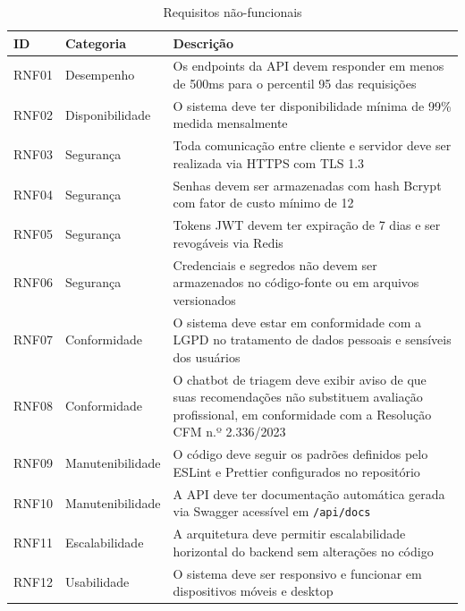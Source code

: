 \begin{table}[H]
  \centering
  \caption{Requisitos não-funcionais}
  \label{tab:non-functional-requirements}
  \begin{tabular}{p{1.2cm}p{3cm}p{7cm}}
    \toprule
    \textbf{ID} &
    \textbf{Categoria} &
    \textbf{Descrição} \\
    \midrule
    RNF01 & Desempenho
          & Os endpoints da API devem responder
            em menos de 500ms para o percentil
            95 das requisições \\
    RNF02 & Disponibilidade
          & O sistema deve ter disponibilidade
            mínima de 99\% medida mensalmente \\
    RNF03 & Segurança
          & Toda comunicação entre cliente e
            servidor deve ser realizada via
            HTTPS com TLS 1.3 \\
    RNF04 & Segurança
          & Senhas devem ser armazenadas com
            hash Bcrypt com fator de custo
            mínimo de 12 \cite{provos1999} \\
    RNF05 & Segurança
          & Tokens JWT devem ter expiração de
            7 dias e ser revogáveis via Redis
            \cite{rfc7519} \\
    RNF06 & Segurança
          & Credenciais e segredos não devem
            ser armazenados no código-fonte
            ou em arquivos versionados \\
    RNF07 & Conformidade
          & O sistema deve estar em conformidade
            com a LGPD no tratamento de dados
            pessoais e sensíveis dos usuários
            \cite{lgpd2018} \\
    RNF08 & Conformidade
          & O chatbot de triagem deve exibir
            aviso de que suas recomendações não
            substituem avaliação profissional,
            em conformidade com a Resolução
            CFM n.º 2.336/2023 \cite{cfm23362023} \\
    RNF09 & Manutenibilidade
          & O código deve seguir os padrões
            definidos pelo ESLint e Prettier
            configurados no repositório \\
    RNF10 & Manutenibilidade
          & A API deve ter documentação
            automática gerada via Swagger
            acessível em \texttt{/api/docs} \\
    RNF11 & Escalabilidade
          & A arquitetura deve permitir
            escalabilidade horizontal do
            backend sem alterações no código \\
    RNF12 & Usabilidade
          & O sistema deve ser responsivo e
            funcionar em dispositivos móveis
            e desktop \\
    \bottomrule
  \end{tabular}
\end{table}

